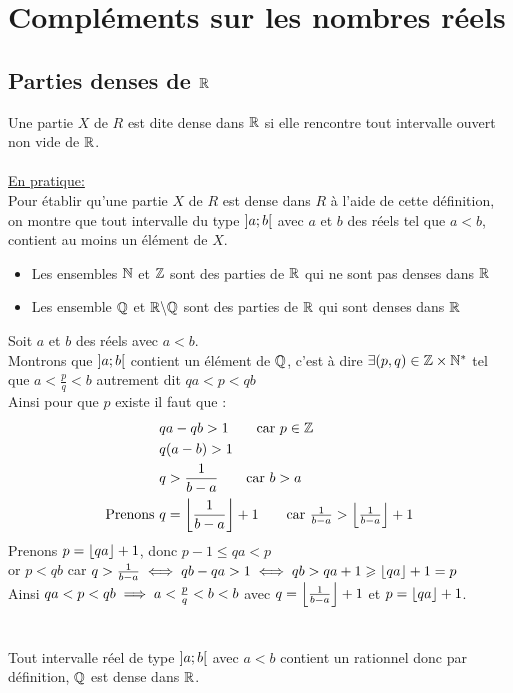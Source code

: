 \chapter{Compléments sur les nombres réels}

\minitoc
\section{Parties denses de \(\mathbb{R}\)}

\begin{defprop}[Généralité]
    Une partie \(X\) de \(R\) est dite dense dans \(\mathbb{R}\) si elle rencontre tout intervalle ouvert non vide de \(\mathbb{R}\). \\
    ~\\
    \underline{En pratique:} \\
    Pour établir qu'une partie \(X\) de \(R\) est dense dans \(R\) à l'aide de cette définition, on montre que tout intervalle du type \(\left]a;b\right[\) avec \(a\) et \(b\) des réels tel que \(a<b\), contient au moins un élément de \(X\).
\end{defprop}

\begin{ex}
\begin{itemize}
    \item Les ensembles \(\mathbb{N}\) et \(\mathbb{Z}\) sont des parties de \(\mathbb{R}\) qui ne sont pas denses dans \(\mathbb{R}\)
    \item Les ensemble \(\mathbb{Q}\) et \(\mathbb{R}\backslash\mathbb{Q}\) sont des parties de \(\mathbb{R}\) qui sont denses dans \(\mathbb{R}\)
\end{itemize}
\end{ex}

\begin{dem}
    Soit \(a\) et \(b\) des réels avec \(a<b\).\\
    Montrons que \(\left]a;b\right[\) contient un élément de \(\mathbb{Q}\), c'est à dire \(\exists (p,q) \in \mathbb{Z}\times\mathbb{N}^*\) tel que \(a<\frac{p}{q}<b\)
    autrement dit \(qa<p<qb\) \\
    Ainsi pour que \(p\) existe il faut que : \\
    \begin{align*}
    &qa - qb > 1       \tag*{car \( p \in \Z \)} \\
    &q(a - b) > 1      \\
    &q > \frac{1}{b-a} \tag*{car \( b > a \)}\\
    \text{Prenons } &q=\floor{\frac{1}{b-a}} +1 \tag*{car \(\frac{1}{b-a}>\floor{\frac{1}{b-a}}+1\)}  
\end{align*}
Prenons \(p=\left\lfloor qa\right\rfloor+1\), donc  \( p-1 \leq qa<p\) \\
or \(p<qb\) car \(q>\frac{1}{b-a} \iff qb-qa>1 \iff qb>qa+1\geqslant \left\lfloor qa\right\rfloor+1=p\) \\
Ainsi \(qa<p<qb\implies a<\frac{p}{q}<b<b\) avec \(q=\left\lfloor\frac{1}{b-a}\right\rfloor +1\) et \(p=\left\lfloor qa\right\rfloor+1\).
\\\\
\conclusion \\
Tout intervalle réel de type \(\left]a;b\right[\) avec \(a<b\) contient un rationnel donc par définition, \(\mathbb{Q}\) est dense dans \(\mathbb{R}\).
\end{dem}

